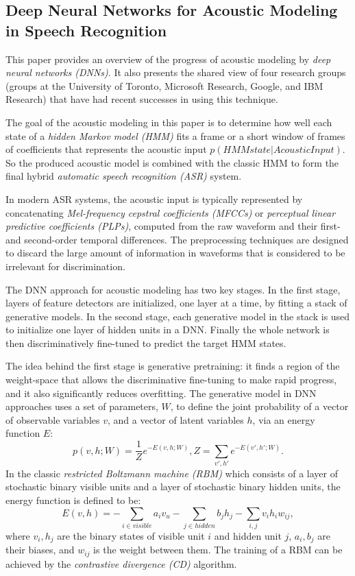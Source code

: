 \subsection{Deep Neural Networks for Acoustic Modeling in Speech Recognition \cite{Hinton2012Deep}}

This paper provides an overview of the progress of acoustic modeling by \emph{deep neural networks (DNNs)}. It also presents the shared view of four research groups (groups at the University of Toronto, Microsoft Research, Google, and IBM Research) that have had recent successes in using this technique.

The goal of the acoustic modeling in this paper is to determine how well each state of a \emph{hidden Markov model (HMM)} fits a frame or a short window of frames of coefficients that represents the acoustic input $p(HMMstate | AcousticInput)$. So the produced acoustic model is combined with the classic HMM to form the final hybrid \emph{automatic speech recognition (ASR)} system.

In modern ASR systems, the acoustic input is typically represented by concatenating \emph{Mel-frequency cepstral coefficients (MFCCs)} or \emph{perceptual linear predictive coefficients (PLPs)}, computed from the raw waveform and their first- and second-order temporal differences. The preprocessing techniques are designed to discard the large amount of information in waveforms that is considered to be irrelevant for discrimination.

The DNN approach for acoustic modeling has two key stages. In the first stage, layers of feature detectors are initialized, one layer at a time, by fitting a stack of generative models. In the second stage, each generative model in the stack is used to initialize one layer of hidden units in a DNN. Finally the whole network is then discriminatively fine-tuned to predict the target HMM states.

The idea behind the first stage is generative pretraining: it finds a region of the weight-space that allows the discriminative fine-tuning to make rapid progress, and it also significantly reduces overfitting. The generative model in DNN approaches uses a set of parameters, $W$, to define the joint probability of a vector of observable variables $v$, and a vector of latent variables $h$, via an energy function $E$:
$$p(v,h; W) = \frac{1}{Z} e^{-E(v,h; W)}, Z = \sum_{v', h'} e^{-E(v', h'; W)}.$$
In the classic \emph{restricted Boltzmann machine (RBM)} which consists of a layer of stochastic binary visible units and a layer of stochastic binary hidden units, the energy function is defined to be:
$$E(v,h) = -\sum_{i \in  visible} a_i v_u - \sum_{j \in hidden} b_j h_j - \sum_{i,j} v_i h_i w_{ij},$$
where $v_i, h_j$ are the binary states of visible unit $i$ and hidden unit $j$, $a_i, b_j$ are their biases, and $w_{ij}$ is the weight between them. The training of a RBM can be achieved by the \emph{contrastive divergence (CD)} algorithm.

